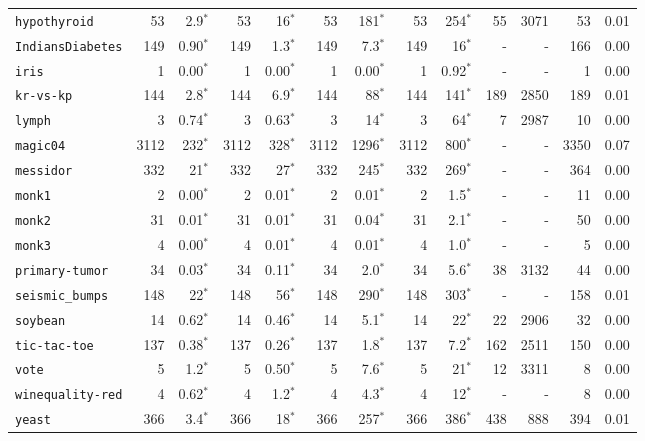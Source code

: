 \begin{tabular}{lrrrrrrrrrrrr}
\texttt{hypothyroid} & 53 & 2.9$^*$ & 53 & 16$^*$ & 53 & 181$^*$ & 53 & 254$^*$ & 55 & 3071 & 53 & 0.01\\
\texttt{IndiansDiabetes} & 149 & 0.90$^*$ & 149 & 1.3$^*$ & 149 & 7.3$^*$ & 149 & 16$^*$ & - & - & 166 & 0.00\\
\texttt{iris} & 1 & 0.00$^*$ & 1 & 0.00$^*$ & 1 & 0.00$^*$ & 1 & 0.92$^*$ & - & - & 1 & 0.00\\
\texttt{kr-vs-kp} & 144 & 2.8$^*$ & 144 & 6.9$^*$ & 144 & 88$^*$ & 144 & 141$^*$ & 189 & 2850 & 189 & 0.01\\
\texttt{lymph} & 3 & 0.74$^*$ & 3 & 0.63$^*$ & 3 & 14$^*$ & 3 & 64$^*$ & 7 & 2987 & 10 & 0.00\\
\texttt{magic04} & 3112 & 232$^*$ & 3112 & 328$^*$ & 3112 & 1296$^*$ & 3112 & 800$^*$ & - & - & 3350 & 0.07\\
\texttt{messidor} & 332 & 21$^*$ & 332 & 27$^*$ & 332 & 245$^*$ & 332 & 269$^*$ & - & - & 364 & 0.00\\
\texttt{monk1} & 2 & 0.00$^*$ & 2 & 0.01$^*$ & 2 & 0.01$^*$ & 2 & 1.5$^*$ & - & - & 11 & 0.00\\
\texttt{monk2} & 31 & 0.01$^*$ & 31 & 0.01$^*$ & 31 & 0.04$^*$ & 31 & 2.1$^*$ & - & - & 50 & 0.00\\
\texttt{monk3} & 4 & 0.00$^*$ & 4 & 0.01$^*$ & 4 & 0.01$^*$ & 4 & 1.0$^*$ & - & - & 5 & 0.00\\
\texttt{primary-tumor} & 34 & 0.03$^*$ & 34 & 0.11$^*$ & 34 & 2.0$^*$ & 34 & 5.6$^*$ & 38 & 3132 & 44 & 0.00\\
\texttt{seismic\_bumps} & 148 & 22$^*$ & 148 & 56$^*$ & 148 & 290$^*$ & 148 & 303$^*$ & - & - & 158 & 0.01\\
\texttt{soybean} & 14 & 0.62$^*$ & 14 & 0.46$^*$ & 14 & 5.1$^*$ & 14 & 22$^*$ & 22 & 2906 & 32 & 0.00\\
\texttt{tic-tac-toe} & 137 & 0.38$^*$ & 137 & 0.26$^*$ & 137 & 1.8$^*$ & 137 & 7.2$^*$ & 162 & 2511 & 150 & 0.00\\
\texttt{vote} & 5 & 1.2$^*$ & 5 & 0.50$^*$ & 5 & 7.6$^*$ & 5 & 21$^*$ & 12 & 3311 & 8 & 0.00\\
\texttt{winequality-red} & 4 & 0.62$^*$ & 4 & 1.2$^*$ & 4 & 4.3$^*$ & 4 & 12$^*$ & - & - & 8 & 0.00\\
\texttt{yeast} & 366 & 3.4$^*$ & 366 & 18$^*$ & 366 & 257$^*$ & 366 & 386$^*$ & 438 & 888 & 394 & 0.01\\
\bottomrule
\end{tabular}
